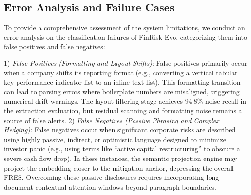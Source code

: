 \documentclass[journal]{IEEEtran}
\begin{document}
\begin{table}[h]
\centering
\caption{Exploratory Volatility Regression Results}
\label{tab:volatility_reg}
\end{table}

\subsection{Error Analysis and Failure Cases}
To provide a comprehensive assessment of the system limitations, we conduct an error analysis on the classification failures of FinRisk-Evo, categorizing them into false positives and false negatives:

1) \textit{False Positives (Formatting and Layout Shifts)}: False positives primarily occur when a company shifts its reporting format (e.g., converting a vertical tabular key-performance indicator list to an inline text list). This formatting transition can lead to parsing errors where boilerplate numbers are misaligned, triggering numerical drift warnings. The layout-filtering stage achieves 94.8\% noise recall in the extraction evaluation, but residual scanning and formatting noise remains a source of false alerts.
2) \textit{False Negatives (Passive Phrasing and Complex Hedging)}: False negatives occur when significant corporate risks are described using highly passive, indirect, or optimistic language designed to minimize investor panic (e.g., using terms like ``active capital restructuring'' to obscure a severe cash flow drop). In these instances, the semantic projection engine may project the embedding closer to the mitigation anchor, depressing the overall FRES. Overcoming these passive disclosures requires incorporating long-document contextual attention windows beyond paragraph boundaries.
\end{document}
